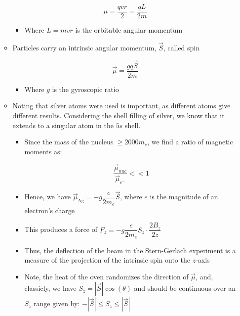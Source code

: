 \begin{itemize}
\begin{itemize}
        $$\mu=\frac{qvr}{2}=\frac{qL}{2m}$$

        \begin{itemize}

          \item Where $L=mvr$ is the orbitable angular momentum

        \end{itemize}

      \item Particles carry an intrinsic angular momentum, $\vec{S}$, called spin

        $$\vec{\mu}=\frac{gq\vec{S}}{2m}$$

        \begin{itemize}

          \item Where $g$ is the gyroscopic ratio

        \end{itemize}

      \item Noting that silver atoms were used is important, as different atoms give different results. Considering the shell filling of silver, we know that it extends to a singular atom in the $5s$ shell.

        \begin{itemize}

          \item Since the mass of the nucleus $\geq 2000m_e$, we find a ratio of magnetic moments as:

            $$\frac{\vec{\mu}_{nuc}}{\vec{\mu}_{e^-}}<<1$$

          \item Hence, we have $\vec{\mu}_{\text{Ag}}=-g\dfrac{e}{2m_e}\vec{S}$, where $e$ is the magnitude of an electron's charge

          \item This produces a force of $F_z=-g\dfrac{e}{2m_e}S_z\cdot\dfrac{2B_z}{2z}$

          \item Thus, the deflection of the beam in the Stern-Gerlach experiment is a measure of the projection of the intrinsic spin onto the $z$-axis

          \item Note, the heat of the oven randomizes the direction of $\vec{\mu}$, and, classicly, we have $S_z=|\vec{S}|\cos(\theta)$ and should be continuous over an $S_z$ range given by: $-|\vec{S}|\leq S_z\leq |\vec{S}|$


\end{itemize}
\end{itemize}
\end{itemize}
